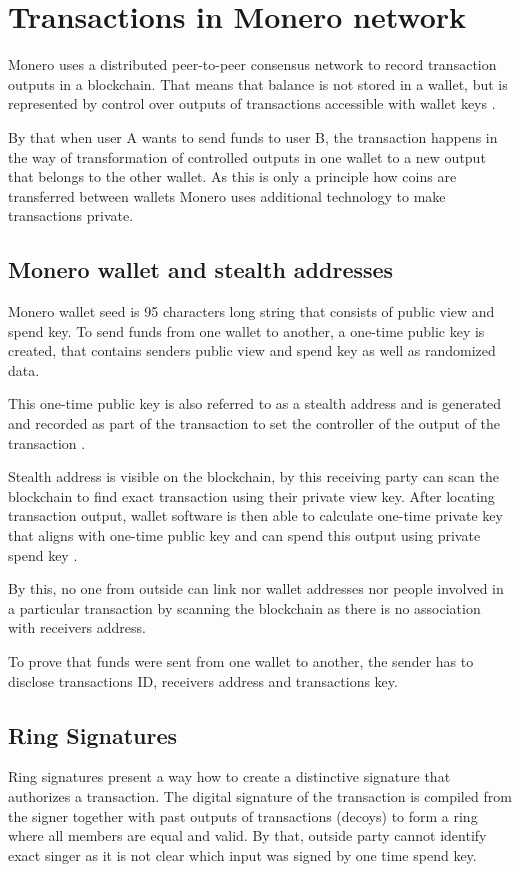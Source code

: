 \documentclass[
  printed, %
  table,   %
  nolof,     %
  nolot,     %
           oneside, color
]{fithesis3}
\begin{document}
\section{Transactions in Monero network}
Monero uses a distributed peer-to-peer consensus network to record transaction outputs in a blockchain. That means that balance is not stored in a wallet, but is represented by control over outputs of transactions accessible with wallet keys \cite{seguias2018moneroa}.

By that when user A wants to send funds to user B, the transaction happens in the way of transformation of controlled outputs in one wallet to a new output that belongs to the other wallet. As this is only a principle how coins are transferred between wallets Monero uses additional technology to make transactions private.
\subsection{Monero wallet and stealth addresses}
\label{sec:stealthaddresses}
Monero wallet seed is 95 characters long string that consists of public view and spend key. To send funds from one wallet to another, a one-time public key is created, that contains senders public view and spend key as well as randomized data. 

This one-time public key is also referred to as a stealth address and is generated and recorded as part of the transaction to set the controller of the output of the transaction \cite{seguias2018monero}.

Stealth address is visible on the blockchain, by this receiving party can scan the blockchain to find exact transaction using their private view key. After locating transaction output, wallet software is then able to calculate one-time private key that aligns with one-time public key and can spend this output using private spend key \cite{courtois2017stealth}.

By this, no one from outside can link nor wallet addresses nor people involved in a particular transaction by scanning the blockchain as there is no association with receivers address.

To prove that funds were sent from one wallet to another, the sender has to disclose transactions ID, receivers address and transactions key.

\subsection{Ring Signatures}
\label{sec:ringsignatures}
Ring signatures present a way how to create a distinctive signature that authorizes a transaction. The digital signature of the transaction is compiled from the signer together with past outputs of transactions (decoys) to form a ring where all members are equal and valid. By that, outside party cannot identify exact singer as it is not clear which input was signed by one time spend key\cite{mercer2016privacy}.
\end{document}
